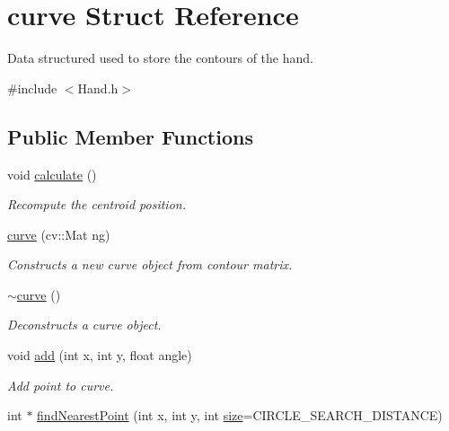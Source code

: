 \hypertarget{structcurve}{}\section{curve Struct Reference}
\label{structcurve}


Data structured used to store the contours of the hand.  




{\ttfamily \#include $<$Hand.\+h$>$}

\subsection*{Public Member Functions}
\begin{DoxyCompactItemize}
\item 
\hypertarget{structcurve_ac2eb55cb594a07df07ae1c88b3036414}{}\label{structcurve_ac2eb55cb594a07df07ae1c88b3036414} 
void \hyperlink{structcurve_ac2eb55cb594a07df07ae1c88b3036414}{calculate} ()
\begin{DoxyCompactList}\small\item\em Recompute the centroid position. \end{DoxyCompactList}\item 
\hyperlink{structcurve_aa067033135a192272005a3ae557a4f25}{curve} (cv\+::\+Mat ng)
\begin{DoxyCompactList}\small\item\em Constructs a new curve object from contour matrix. \end{DoxyCompactList}\item 
\hypertarget{structcurve_a0bacd81cfa6ed01251210d2e5d6b29a4}{}\label{structcurve_a0bacd81cfa6ed01251210d2e5d6b29a4} 
\hyperlink{structcurve_a0bacd81cfa6ed01251210d2e5d6b29a4}{$\sim$curve} ()
\begin{DoxyCompactList}\small\item\em Deconstructs a curve object. \end{DoxyCompactList}\item 
void \hyperlink{structcurve_aa4847c1d83d062c243ef641f67144cd0}{add} (int x, int y, float angle)
\begin{DoxyCompactList}\small\item\em Add point to curve. \end{DoxyCompactList}\item 
int $\ast$ \hyperlink{structcurve_a8cd0f602bdbc43b2ee5f4f7dc20e3c3a}{find\+Nearest\+Point} (int x, int y, int \hyperlink{structcurve_a6a90092a2b62540ae3993cdb469f8451}{size}=C\+I\+R\+C\+L\+E\+\_\+\+S\+E\+A\+R\+C\+H\+\_\+\+D\+I\+S\+T\+A\+N\+CE)

\end{DoxyCompactItemize}
